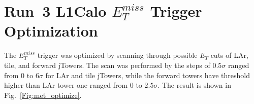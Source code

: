 \chapter{Run~3 L1Calo $E^{miss}_{T}$ Trigger Optimization}
The $E^{miss}_{T}$ trigger was optimized by scanning through possible $E_T$ cuts of LAr, tile, and forward jTowers. The scan was performed by the steps of $0.5\sigma$ ranged from 0 to $6\sigma$ for LAr and tile jTowers, while the forward towers have threshold higher than LAr tower one ranged from 0 to $2.5\sigma$. The result is shown in Fig.~\ref{Fig:met_optimize}.
\begin{figure}[ht]
	\centering
	\\
	\\

\end{figure}
